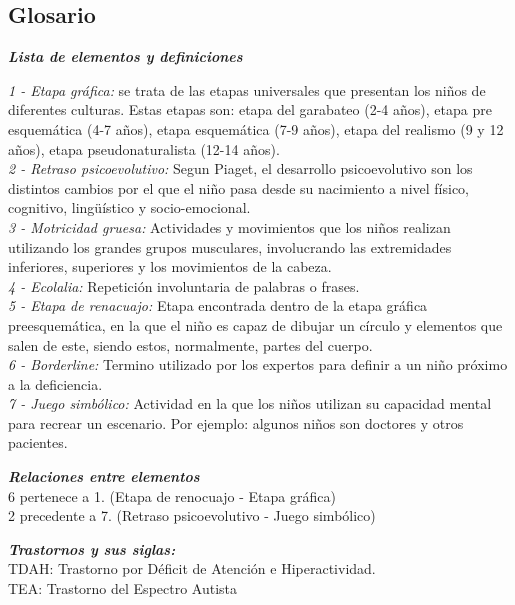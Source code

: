 \documentclass[letterpaper,12pt]{article}
\begin{document}
\subsection{Glosario}
\begin{flushleft}
\textbf{\textit{Lista de elementos y definiciones}}

\textit{1 - Etapa gráfica:} se trata de las etapas universales que presentan los niños de diferentes culturas. Estas etapas son: etapa del garabateo (2-4 años), etapa pre esquemática (4-7 años), etapa esquemática (7-9 años), etapa del realismo (9 y 12 años), etapa pseudonaturalista (12-14 años). \\
\textit{2 - Retraso psicoevolutivo: }Segun Piaget, el desarrollo psicoevolutivo son los distintos cambios por el que el niño pasa desde su nacimiento a nivel físico, cognitivo, lingüístico y socio-emocional. \\
\textit{3 - Motricidad gruesa:} Actividades y movimientos que los niños realizan utilizando los grandes grupos musculares, involucrando las extremidades inferiores, superiores y los movimientos de la cabeza. \\
\textit{4 - Ecolalia:} Repetición involuntaria de palabras o frases. \\
\textit{5 - Etapa de renacuajo:} Etapa encontrada dentro de la etapa gráfica preesquemática, en la que el niño es capaz de dibujar un círculo y elementos que salen de este, siendo estos, normalmente, partes del cuerpo. \\
\textit{6 - Borderline:} Termino utilizado por los expertos para definir a un niño próximo a la deficiencia.\\
\textit{7 - Juego simbólico:} Actividad en la que los niños utilizan su capacidad mental para recrear un escenario. Por ejemplo: algunos niños son doctores y otros pacientes.\\
\end{flushleft}
\begin{flushleft}
\textbf{\textit{Relaciones entre elementos}}\\
6 pertenece a 1. (Etapa de renocuajo - Etapa gráfica) \\
2 precedente a 7. (Retraso psicoevolutivo - Juego simbólico)\\
\end{flushleft}

\begin{flushleft}
\textbf{\textit{Trastornos y sus siglas:}}\\
TDAH: Trastorno por Déficit de Atención e Hiperactividad. \\
TEA: Trastorno del Espectro Autista \\
\end{flushleft}
\end{document}
